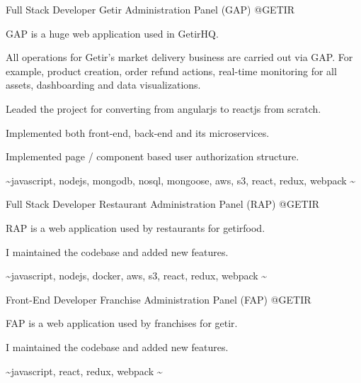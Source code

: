 

\begin{cventries}


  \cventry
    {Full Stack Developer} %
    {Getir Administration Panel (GAP)} %
    {@GETIR} %
    {}
    {
      \begin{cvitems} %
        \item {GAP is a huge web application used in GetirHQ.}
        \item {All operations for Getir's market delivery business are carried out via GAP. For example, product creation, order refund actions, real-time monitoring for all assets, dashboarding and data visualizations.}
        \item {Leaded the project for converting from angularjs to reactjs from scratch.}
        \item {Implemented both front-end, back-end and its microservices.}
        \item {Implemented page / component based user authorization structure.}
        \item {\textasciitilde javascript, nodejs, mongodb, nosql, mongoose, aws, s3, react, redux, webpack \textasciitilde}
      \end{cvitems}
    }

  \cventry
    {Full Stack Developer} %
    {Restaurant Administration Panel (RAP)} %
    {@GETIR} %
    {}
    {
      \begin{cvitems} %
        \item {RAP is a web application used by restaurants for getirfood.}
        \item {I maintained the codebase and added new features.}
        \item {\textasciitilde javascript, nodejs, docker, aws, s3, react, redux, webpack \textasciitilde}
      \end{cvitems}
    }

  \cventry
    {Front-End Developer} %
    {Franchise Administration Panel (FAP)} %
    {@GETIR} %
    {}
    {
      \begin{cvitems} %
        \item {FAP is a web application used by franchises for getir.}
        \item {I maintained the codebase and added new features.}
        \item {\textasciitilde javascript, react, redux, webpack \textasciitilde}
      \end{cvitems}
    }


\end{cventries}
